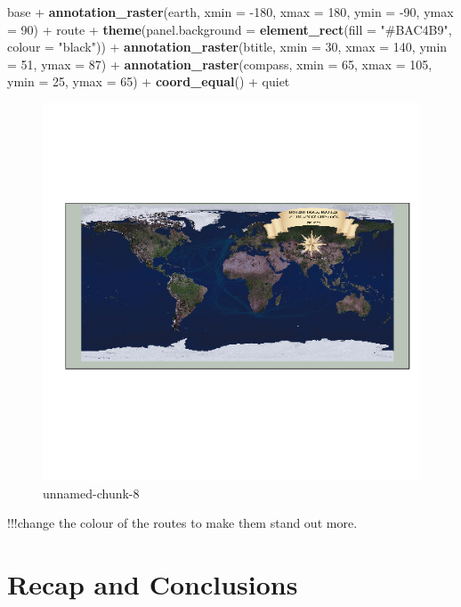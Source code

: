 \documentclass[]{article}
\makeatletter
\newenvironment{Shaded}{}{}
\newcommand{\KeywordTok}[1]{\textcolor[rgb]{0.00,0.44,0.13}{\textbf{{#1}}}}
\newcommand{\DataTypeTok}[1]{\textcolor[rgb]{0.56,0.13,0.00}{{#1}}}
\newcommand{\DecValTok}[1]{\textcolor[rgb]{0.25,0.63,0.44}{{#1}}}
\newcommand{\StringTok}[1]{\textcolor[rgb]{0.25,0.44,0.63}{{#1}}}
\newcommand{\NormalTok}[1]{{#1}}
\def\maxwidth{\ifdim\Gin@nat@width>\linewidth\linewidth
\else\Gin@nat@width\fi}
\let\Oldincludegraphics\includegraphics
\renewcommand{\includegraphics}[1]{\Oldincludegraphics[width=\maxwidth]{#1}}
\makeatother
\begin{document}
\begin{Shaded}
\begin{Highlighting}[]
\NormalTok{base + }\KeywordTok{annotation_raster}\NormalTok{(earth, }\DataTypeTok{xmin =} \NormalTok{-}\DecValTok{180}\NormalTok{, }\DataTypeTok{xmax =} \DecValTok{180}\NormalTok{, }\DataTypeTok{ymin =} \NormalTok{-}\DecValTok{90}\NormalTok{, }\DataTypeTok{ymax =} \DecValTok{90}\NormalTok{) + }
    \NormalTok{route + }\KeywordTok{theme}\NormalTok{(}\DataTypeTok{panel.background =} \KeywordTok{element_rect}\NormalTok{(}\DataTypeTok{fill =} \StringTok{"#BAC4B9"}\NormalTok{, }\DataTypeTok{colour =} \StringTok{"black"}\NormalTok{)) + }
    \KeywordTok{annotation_raster}\NormalTok{(btitle, }\DataTypeTok{xmin =} \DecValTok{30}\NormalTok{, }\DataTypeTok{xmax =} \DecValTok{140}\NormalTok{, }\DataTypeTok{ymin =} \DecValTok{51}\NormalTok{, }\DataTypeTok{ymax =} \DecValTok{87}\NormalTok{) + }
    \KeywordTok{annotation_raster}\NormalTok{(compass, }\DataTypeTok{xmin =} \DecValTok{65}\NormalTok{, }\DataTypeTok{xmax =} \DecValTok{105}\NormalTok{, }\DataTypeTok{ymin =} \DecValTok{25}\NormalTok{, }\DataTypeTok{ymax =} \DecValTok{65}\NormalTok{) + }
    \KeywordTok{coord_equal}\NormalTok{() + quiet}
\end{Highlighting}
\end{Shaded}
\begin{figure}[htbp]
\centering
\includegraphics{figure/unnamed-chunk-8.png}
\caption{unnamed-chunk-8}
\end{figure}

!!!change the colour of the routes to make them stand out more.

\section{Recap and Conclusions}
\end{document}
